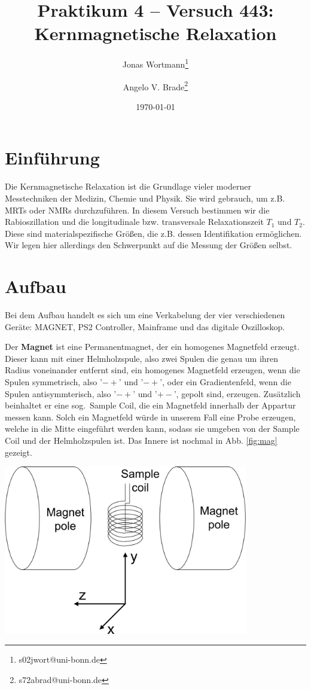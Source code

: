 \documentclass[10pt]{article}
\title{Praktikum 4 -- Versuch 443: Kernmagnetische Relaxation}
\author[1]{Jonas Wortmann\thanks{s02jwort@uni-bonn.de}}
\author[1]{Angelo V. Brade\thanks{s72abrad@uni-bonn.de}}
\affil[1]{Rheinische Friedrich-Wilhelms-Universität Bonn}
\date{\today}
\newenvironment{Figure}
  {\par\medskip\noindent\minipage{\linewidth}}
  {\endminipage\par\medskip}
\begin{document}
\maketitle
\newpage

\tableofcontents
\newpage


\pagestyle{fancy}
\fancyhead[R]{\thepage}
\fancyhead[L]{\leftmark}


\begin{multicols}{2}
  \section{Einführung}
  Die Kernmagnetische Relaxation ist die Grundlage vieler moderner Messtechniken der Medizin, Chemie und Physik. Sie wird gebrauch, um z.B. MRTs oder NMRs durchzuführen. In diesem Versuch bestimmen wir die Rabioszillation und die longitudinale bzw. transversale Relaxationszeit $T_1$ und $T_2$. Diese sind materialspezifische Größen, die z.B. dessen Identifikation ermöglichen. Wir legen hier allerdings den Schwerpunkt auf die Messung der Größen selbst.
  \section{Aufbau}
  Bei dem Aufbau handelt es sich um eine Verkabelung der vier verschiedenen Geräte: MAGNET, PS2 Controller, Mainframe und das digitale Oszilloskop.
  
  Der \textbf{Magnet} ist eine Permanentmagnet, der ein homogenes Magnetfeld erzeugt. Dieser kann mit einer Helmholzspule, also zwei Spulen die genau um ihren Radius voneinander entfernt sind, ein homogenes Magnetfeld erzeugen, wenn die Spulen symmetrisch, also '$-+$' und '$-+$', oder ein Gradientenfeld, wenn die Spulen antisymmterisch, also '$-+$' und '$+-$', gepolt sind, erzeugen. Zusätzlich beinhaltet er eine sog.\ Sample Coil, die ein Magnetfeld innerhalb der Appartur messen kann. Solch ein Magnetfeld würde in unserem Fall eine Probe erzeugen, welche in die Mitte eingeführt werden kann, sodass sie umgeben von der Sample Coil und der Helmholzspulen ist. Das Innere ist nochmal in Abb. \ref{fig:mag} gezeigt.
\begin{Figure}
  \centering\includegraphics[width=0.8\textwidth]{magnet_aufbau.png}
  \label{fig:mag}
\end{Figure}


\end{multicols}
\end{document}

